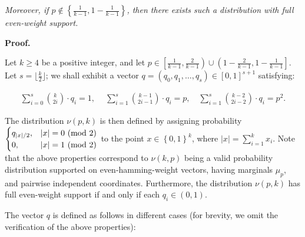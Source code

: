 \documentclass[10pt,a4paper]{article}
\begin{document}
\emph{Moreover, if $p\not\in\left\{\frac{1}{k-1},1-\frac{1}{k-1}\right\}$, then there exists such a distribution with full even-weight support.}\par






\par\medskip\noindent\textbf{Proof.}\par




Let $k\geqslant 4$ be a positive integer, and let $p\in\left[\frac{1}{k-1},\frac{2}{k-1}\right)\cup\left(1-\frac{2}{k-1},1-\frac{1}{k-1}\right]$.
Let $s=\lfloor\frac{k}{2}\rfloor$; we shall exhibit a vector $q=(q_{0},q_{1},\dots,q_{s})\in[0,1]^{s+1}$ satisfying:\par


\[\begin{gathered}
\sum_{i=0}^{s}\binom{k}{2i}\cdot q_{i}=1,\ \quad\sum_{i=1}^{s}\binom{k-1}{2i-1}\cdot q_{i}=p,\quad\sum_{i=1}^{s}\binom{k-2}{2i-2}\cdot q_{i}=p^{2}.
\end{gathered}\]


The distribution $\nu(p,k)$ is then defined by assigning probability $\begin{cases}q_{\left|x\right|/2},&\left|x\right|=0\textnormal{ (mod 2)}\\
0,&\left|x\right|=1\textnormal{ (mod 2)}\end{cases}$ to the point $x\in\left\{0,1\right\}^{k}$, where $\left|x\right|=\sum_{i=1}^{k}x_{i}$.
Note that the above properties correspond to $\nu(k,p)$ being a valid probability distribution supported on even-hamming-weight vectors, having marginals $\mu_{p}$, and pairwise independent coordinates.
Furthermore, the distribution $\nu(p,k)$ has full even-weight support if and only if each $q_{i}\in(0,1)$.\par




The vector $q$ is defined as follows in different cases (for brevity, we omit the verification of the above properties):\par
\end{document}
